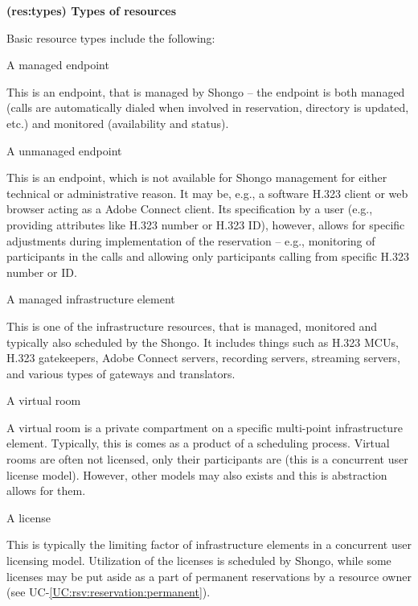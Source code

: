 \documentclass[a4paper]{report}
\makeatletter
\newcounter{UCcounter}
\newenvironment{UseCases}%
	{\begin{list}{\textbf{UC-\arabic{UCcounter}}}{\@nmbrlisttrue\def\@listctr{UCcounter}}}%
	{\end{list}}
\newcommand{\UClabel}[1]{\label{UC:#1}}
\newcommand{\UCref}[1]{UC-\ref{UC:#1}}
\newcommand{\UseCase}[2]{\item\UClabel{#2} \textbf{(#2) #1}\\ \nopagebreak}
\makeatother
\begin{document}
\begin{UseCases}

\UseCase{Types of resources}{res:types}

Basic resource types include the following:

\begin{compactdesc}

\item[A managed endpoint]

This is an endpoint, that is managed by Shongo -- the endpoint is both managed
(calls are automatically dialed when involved in reservation, directory is
updated, etc.) and monitored (availability and status).

\item[A unmanaged endpoint] 

This is an endpoint, which is not available for Shongo management for either
technical or administrative reason. It may be, e.g., a software H.323 client or
web browser acting as a Adobe Connect client. Its specification by a user
(e.g., providing attributes like H.323 number or H.323 ID), however, allows for
specific adjustments during implementation of the reservation -- e.g.,
monitoring of participants in the calls and allowing only participants calling
from specific H.323 number or ID.

\item[A managed infrastructure element]

This is one of the infrastructure resources, that is managed, monitored and
typically also scheduled by the Shongo. It includes things such as H.323 MCUs,
H.323 gatekeepers, Adobe Connect servers, recording servers, streaming servers,
and various types of gateways and translators.

\item[A virtual room] 

A virtual room is a private compartment on a specific multi-point
infrastructure element. Typically, this is comes as a product of a scheduling
process. Virtual rooms are often not licensed, only their participants are
(this is a concurrent user license model). However, other models may also
exists and this is abstraction allows for them.

\item[A license]

This is typically the limiting factor of infrastructure elements in a
concurrent user licensing model. Utilization of the licenses is scheduled by
Shongo, while some licenses may be put aside as a part of permanent
reservations by a resource owner (see \UCref{rsv:reservation:permanent}).


\end{compactdesc}
\end{UseCases}
\end{document}
